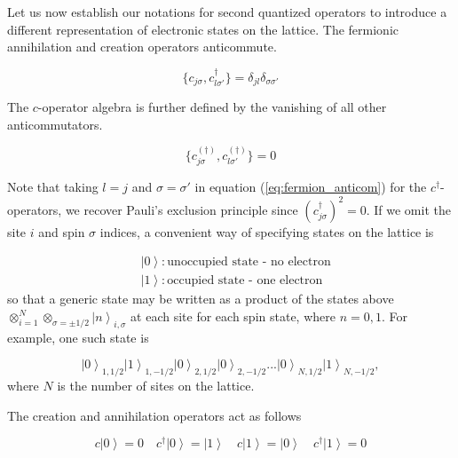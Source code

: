 Let us now establish our notations for second quantized operators to introduce a different representation of electronic states on the lattice.
The fermionic annihilation and creation operators anticommute.

\begin{equation}
\{ c_{j\sigma} , c_{l \sigma'}^\dagger \} = \delta_{jl} \delta_{\sigma\sigma'}
\end{equation}

The $c$-operator algebra is further defined by the vanishing of all other anticommutators.

\begin{equation}\label{eq:fermion_anticom}
\{ c_{j\sigma}^{(\dagger)} , c_{l \sigma'}^{(\dagger)} \} = 0
\end{equation}

Note that taking $l = j$ and $\sigma = \sigma'$ in equation (\ref{eq:fermion_anticom}) for the $c^\dagger$-operators, we recover Pauli's exclusion principle since $(c_{j\sigma}^\dagger)^2 = 0$.
If we omit the site $i$ and spin $\sigma$ indices, a convenient way of specifying states on the lattice is

\begin{equation}
\begin{split}
&\left| 0 \right\rangle : \text{unoccupied state - no electron} \\
&\left| 1 \right\rangle : \text{occupied state - one electron}
\end{split}
\end{equation}
so that a generic state may be written as a product of the states above $\otimes_{i=1}^{N} \otimes_{\sigma = \pm 1/2} \left| n \right\rangle_{i, \sigma}$ at each site for each spin state, where $n= 0, 1$.
For example, one such state is

\begin{equation}
\left| 0 \right\rangle_{1, 1/2} \left| 1 \right\rangle_{1, -1/2} \left| 0 \right\rangle_{2, 1/2} \left| 0 \right\rangle_{2, -1/2} ... \left| 0 \right\rangle_{N, 1/2} \left| 1 \right\rangle_{N, -1/2}  ,
\end{equation}
where $N$ is the number of sites on the lattice.

The creation and annihilation operators act as follows

\begin{equation}
c \left| 0 \right\rangle = 0 \quad c^\dagger \left| 0 \right\rangle = \left| 1 \right\rangle \quad c \left| 1 \right\rangle = \left| 0 \right\rangle \quad c^\dagger \left| 1 \right\rangle = 0
\end{equation}

